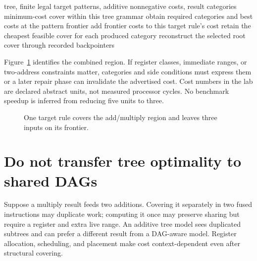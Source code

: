 \begin{algorithm}[htbp]
\caption{Compute a minimum additive target cover for a finite expression tree.}
\label{alg:ch88-dp}
\begin{pseudocode}
\Require tree, finite legal target patterns, additive nonnegative costs, result categories
\Ensure minimum-cost cover within this tree grammar
\State obtain required categories and best costs at the pattern frontier
\State add frontier costs to this target rule's cost
\State retain the cheapest feasible cover for each produced category
\EndFor
\EndFor
\State reconstruct the selected root cover through recorded backpointers
\end{pseudocode}
\end{algorithm}

Figure~\ref{fig:ch88-cover} identifies the combined region.
If register classes, immediate ranges, or two-address constraints matter, categories and side conditions must express them or a later repair phase can invalidate the advertised cost.
Cost numbers in the lab are declared abstract units, not measured processor cycles.
No benchmark speedup is inferred from reducing five units to three.

\begin{figure}[htbp]
\centering
{}
\caption{One target rule covers the add/multiply region and leaves three inputs on its frontier.}
\label{fig:ch88-cover}
\end{figure}

\section{Do not transfer tree optimality to shared DAGs}
\label{sec:ch88-dags}
Suppose a multiply result feeds two additions.
Covering it separately in two fused instructions may duplicate work; computing it once may preserve sharing but require a register and extra live range.
An additive tree model sees duplicated subtrees and can prefer a different result from a DAG-aware model.
Register allocation, scheduling, and placement make cost context-dependent even after structural covering.

